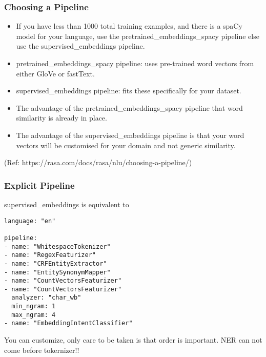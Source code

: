 \begin{frame}[fragile]\frametitle{Choosing a Pipeline}
\begin{itemize}
\item If you have less than 1000 total training examples, and there is a spaCy model for your language, use the pretrained\_embeddings\_spacy pipeline else  use the supervised\_embeddings pipeline.
\item pretrained\_embeddings\_spacy pipeline: uses pre-trained word vectors from either GloVe or fastText. 
\item supervised\_embeddings pipeline: fits these specifically for your dataset.
\item The advantage of the pretrained\_embeddings\_spacy pipeline that word similarity is already in place.
\item The advantage of the supervised\_embeddings pipeline is that your word vectors will be customised for your domain and not generic similarity.
\end{itemize}


{\tiny (Ref: https://rasa.com/docs/rasa/nlu/choosing-a-pipeline/)}

\end{frame}

 \begin{frame}[fragile]\frametitle{Explicit Pipeline}
 
supervised\_embeddings is equivalent to 

\begin{lstlisting}
language: "en"

pipeline:
- name: "WhitespaceTokenizer"
- name: "RegexFeaturizer"
- name: "CRFEntityExtractor"
- name: "EntitySynonymMapper"
- name: "CountVectorsFeaturizer"
- name: "CountVectorsFeaturizer"
  analyzer: "char_wb"
  min_ngram: 1
  max_ngram: 4
- name: "EmbeddingIntentClassifier"
\end{lstlisting}
You can customize, only care to be taken is that order is important. NER can not come before tokernizer!!
\end{frame}

